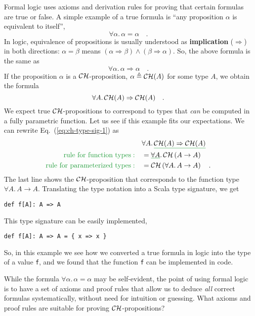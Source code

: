 Formal logic uses axioms and derivation rules for proving that certain
formulas are true or false. A simple example of a true formula is
\textsf{``}any proposition $\alpha$ is equivalent to itself\textsf{''},
\[
\forall\alpha.\,\alpha=\alpha\quad.
\]
In logic, equivalence of propositions is usually understood
as \textbf{implication} ($\Rightarrow$)
in both directions: $\alpha=\beta$ means $\left(\alpha\Rightarrow\beta\right)\wedge\left(\beta\Rightarrow\alpha\right)$.
So, the above formula is the same as
\[
\forall\alpha.\,\alpha\Rightarrow\alpha\quad.
\]
If the proposition $\alpha$ is a ${\cal CH}$-proposition, $\alpha\triangleq{\cal CH}(A)$
for some type $A$, we obtain the formula
\begin{equation}
\forall A.\,{\cal CH}(A)\Rightarrow{\cal CH}(A)\quad.\label{eq:ch-type-sig-1}
\end{equation}
We expect true ${\cal CH}$-propositions to correspond to types that
\emph{can} be computed in a fully parametric function. Let us see
if this example fits our expectations. We can rewrite Eq.~(\ref{eq:ch-type-sig-1})
as
\begin{align*}
 & \forall A.\,\gunderline{{\cal CH}(A)\Rightarrow{\cal CH}(A)}\\
{\color{greenunder}\text{rule for function types}:}\quad & =\gunderline{\forall A}.\,{\cal CH}\left(A\rightarrow A\right)\\
{\color{greenunder}\text{rule for parameterized types}:}\quad & ={\cal CH}\left(\forall A.\,A\rightarrow A\right)\quad.
\end{align*}
The last line shows the ${\cal CH}$-proposition that corresponds
to the function type $\forall A.\,A\rightarrow A$. Translating the
type notation into a Scala type signature, we get
\begin{lstlisting}
def f[A]: A => A
\end{lstlisting}
This type signature can be easily implemented,
\begin{lstlisting}
def f[A]: A => A = { x => x }
\end{lstlisting}
So, in this example we see how we converted a true formula in logic
into the type of a value \lstinline!f!, and we found that the function
\lstinline!f! can be implemented in code.

While the formula $\forall\alpha.\,\alpha=\alpha$ may be self-evident,
the point of using formal logic is to have a set of axioms and proof
rules that allow us to deduce \emph{all} correct formulas systematically,
without need for intuition or guessing. What axioms and proof rules
are suitable for proving ${\cal CH}$-propositions?

